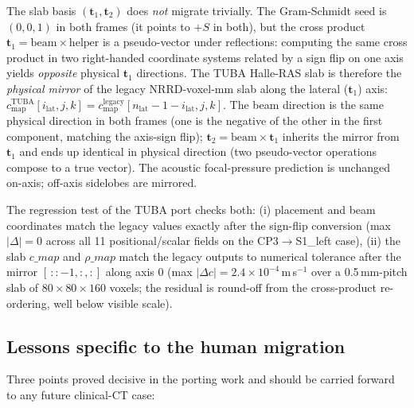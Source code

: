 \documentclass{compactarticle}
\begin{document}
The slab basis $(\mathbf{t}_1, \mathbf{t}_2)$ does {\em not} migrate
trivially. The Gram-Schmidt seed is $(0,0,1)$ in both frames (it
points to $+S$ in both), but the cross product
$\mathbf{t}_1 = \mathrm{beam} \times \mathrm{helper}$ is a pseudo-vector
under reflections: computing the same cross product in two
right-handed coordinate systems related by a sign flip on one axis
yields {\em opposite} physical $\mathbf{t}_1$ directions. The TUBA
Halle-RAS slab is therefore the {\em physical mirror} of the legacy
NRRD-voxel-mm slab along the lateral ($\mathbf{t}_1$) axis:
$c_\mathrm{map}^\mathrm{TUBA}[i_\mathrm{lat}, j, k] =
 c_\mathrm{map}^\mathrm{legacy}[n_\mathrm{lat}-1-i_\mathrm{lat}, j, k]$.
The beam direction is the same physical direction in both frames (one
is the negative of the other in the first component, matching the
axis-sign flip); $\mathbf{t}_2 = \mathrm{beam} \times \mathbf{t}_1$
inherits the mirror from $\mathbf{t}_1$ and ends up identical in
physical direction (two pseudo-vector operations compose to a true
vector). The acoustic focal-pressure prediction is unchanged on-axis;
off-axis sidelobes are mirrored.

The regression test of the TUBA port checks both: (i) placement and
beam coordinates match the legacy values exactly after the sign-flip
conversion (max $|\Delta| = 0$ across all 11 positional/scalar fields
on the CP3$\rightarrow$S1\_left case), (ii) the slab $c\_map$ and
$\rho\_map$ match the legacy outputs to numerical tolerance after the
mirror $[\,::-1, :, :]$ along axis 0 (max $|\Delta c| = 2.4\times
10^{-4}$\,m\,s$^{-1}$ over a 0.5\,mm-pitch slab of $80\times 80\times
160$ voxels; the residual is round-off from the cross-product
re-ordering, well below visible scale).

\subsection{Lessons specific to the human migration}
Three points proved decisive in the porting work and should be carried
forward to any future clinical-CT case:
\end{document}
